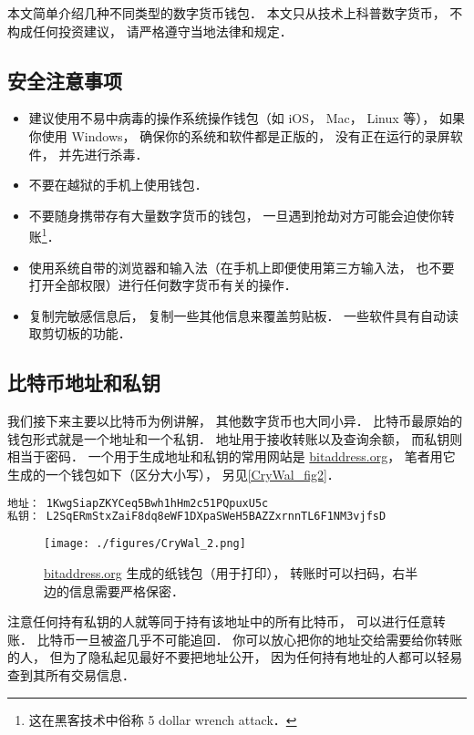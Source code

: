 
本文简单介绍几种不同类型的数字货币钱包． 本文只从技术上科普数字货币， 不构成任何投资建议， 请严格遵守当地法律和规定．

\subsection{安全注意事项}
\begin{itemize}
\item 建议使用不易中病毒的操作系统操作钱包（如 iOS， Mac， Linux 等）， 如果你使用 Windows， 确保你的系统和软件都是正版的， 没有正在运行的录屏软件， 并先进行杀毒．
\item 不要在越狱的手机上使用钱包．
\item 不要随身携带存有大量数字货币的钱包， 一旦遇到抢劫对方可能会迫使你转账\footnote{这在黑客技术中俗称 5 dollar wrench attack．}．
\item 使用系统自带的浏览器和输入法（在手机上即便使用第三方输入法， 也不要打开全部权限）进行任何数字货币有关的操作．
\item 复制完敏感信息后， 复制一些其他信息来覆盖剪贴板． 一些软件具有自动读取剪切板的功能．
\end{itemize}

\subsection{比特币地址和私钥}
我们接下来主要以比特币为例讲解， 其他数字货币也大同小异． 比特币最原始的钱包形式就是一个地址和一个私钥． 地址用于接收转账以及查询余额， 而私钥则相当于密码． 一个用于生成地址和私钥的常用网站是 \href{https://www.bitaddress.org/}{bitaddress.org}， 笔者用它生成的一个钱包如下（区分大小写）， 另见\autoref{CryWal_fig2}．
\begin{lstlisting}[language=bash]
地址： 1KwgSiapZKYCeq5Bwh1hHm2c51PQpuxU5c
私钥： L2SqERmStxZaiF8dq8eWF1DXpaSWeH5BAZZxrnnTL6F1NM3vjfsD
\end{lstlisting}

\begin{figure}[ht]
\centering
\texttt{[image: ./figures/CryWal\_2.png]}
\caption{\href{https://www.bitaddress.org/}{bitaddress.org} 生成的纸钱包（用于打印）， 转账时可以扫码，右半边的信息需要严格保密．} \label{CryWal_fig2}
\end{figure}

注意任何持有私钥的人就等同于持有该地址中的所有比特币， 可以进行任意转账． 比特币一旦被盗几乎不可能追回． 你可以放心把你的地址交给需要给你转账的人， 但为了隐私起见最好不要把地址公开， 因为任何持有地址的人都可以轻易查到其所有交易信息．

